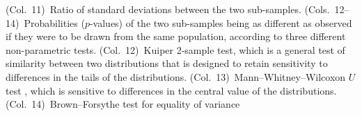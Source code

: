 \begin{tabular}
{  (Col.~11)~Ratio of standard deviations between the two sub-samples.
  (Cols.~12--14)~Probabilities (\(p\)-values) of the two sub-samples being as different as observed if they were to be drawn from the same population, according to three different non-parametric tests.
  (Col.~12)~Kuiper 2-sample test, which is a general test of similarity between two distributions that is designed to retain sensitivity to differences in the tails of the distributions.
  (Col.~13)~Mann--Whitney--Wilcoxon \(U\) test \citep{Mann:1947a}, which is sensitive to differences in the central value of the distributions.
  (Col.~14)~Brown--Forsythe test for equality of variance \citep{Brown:1974a}
}
\end{tabular}
